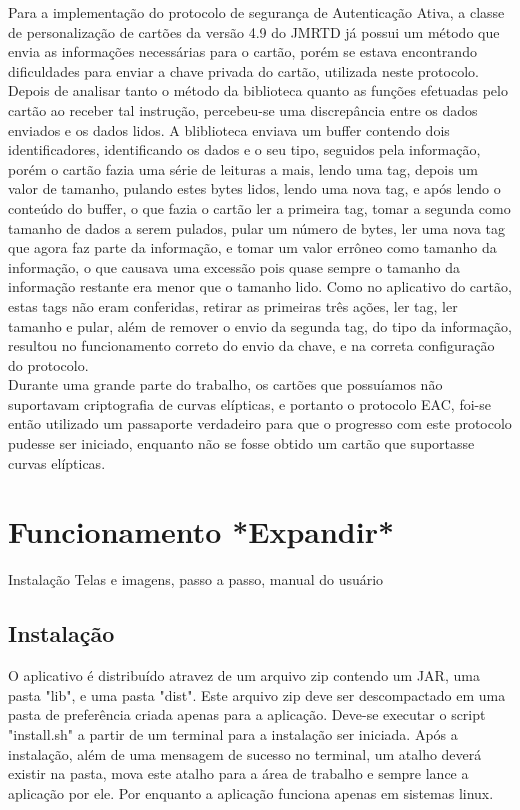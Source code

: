 \documentclass{article}
\begin{document}
\begin{justify}
		\hspace*{2cm}Para a implementação do protocolo de segurança de Autenticação Ativa, a classe de personalização de cartões da versão 4.9 do JMRTD já possui um método que envia as informações necessárias para o cartão, porém se estava encontrando dificuldades para enviar a chave privada do cartão, utilizada neste protocolo. Depois de analisar tanto o método da biblioteca quanto as funções efetuadas pelo cartão ao receber tal instrução, percebeu-se uma discrepância entre os dados enviados e os dados lidos. A bliblioteca enviava um buffer contendo dois identificadores, identificando os dados e o seu tipo, seguidos pela informação, porém o cartão fazia uma série de leituras a mais, lendo uma tag, depois um valor de tamanho, pulando estes bytes lidos, lendo uma nova tag, e após lendo o conteúdo do buffer, o que fazia o cartão ler a primeira tag, tomar a segunda como tamanho de dados a serem pulados, pular um número de bytes, ler uma nova tag que agora faz parte da informação, e tomar um valor errôneo como tamanho da informação, o que causava uma excessão pois quase sempre o tamanho da informação restante era menor que o tamanho lido. Como no aplicativo do cartão, estas tags não eram conferidas, retirar as primeiras três ações, ler tag, ler tamanho e pular, além de remover o envio da segunda tag, do tipo da informação, resultou no funcionamento correto do envio da chave, e na correta configuração do protocolo.\\
		\hspace*{2cm}Durante uma grande parte do trabalho, os cartões que possuíamos não suportavam criptografia de curvas elípticas, e portanto o protocolo EAC, foi-se então utilizado um passaporte verdadeiro para que o progresso com este protocolo pudesse ser iniciado, enquanto não se fosse obtido um cartão que suportasse curvas elípticas.


		\end{justify}

	\section{Funcionamento *Expandir*} Instalação Telas e imagens, passo a passo, manual do usuário
		\subsection{Instalação}
			\begin{justify}
			\hspace*{2cm} O aplicativo é distribuído atravez de um arquivo zip contendo um JAR, uma pasta "lib", e uma pasta "dist". Este arquivo zip deve ser descompactado em uma pasta de preferência criada apenas para a aplicação. Deve-se executar o script "install.sh" a partir de um terminal para a instalação ser iniciada. Após a instalação, além de uma mensagem de sucesso no terminal, um atalho deverá existir na pasta, mova este atalho para a área de trabalho e sempre lance a aplicação por ele. Por enquanto a aplicação funciona apenas em sistemas linux.
			\end{justify}
\end{document}
